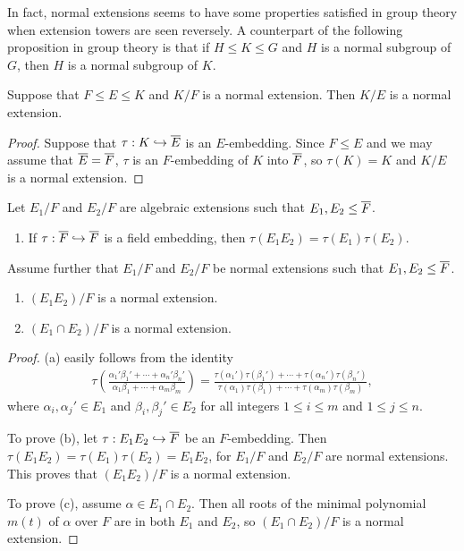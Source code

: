In fact, normal extensions seems to have some properties satisfied in group theory when extension towers are seen reversely.
A counterpart of the following proposition in group theory is that if $H\leq K\leq G$ and $H$ is a normal subgroup of $G$, then $H$ is a normal subgroup of $K$.
\begin{prop}
    Suppose that $F\leq E\leq K$ and $K/F$ is a normal extension.
    Then $K/E$ is a normal extension.
\end{prop}
\begin{proof}
    Suppose that $\tau: K\hookrightarrow\overline{E}$ is an $E$-embedding.
    Since $F\leq E$ and we may assume that $\overline{E}=\overline{F}$, $\tau$ is an $F$-embedding of $K$ into $\overline{F}$, so $\tau(K)=K$ and $K/E$ is a normal extension.
\end{proof}

\begin{prop}
    Let $E_1/F$ and $E_2/F$ are algebraic extensions such that $E_1, E_2\leq\overline{F}$.
    \begin{enumerate}
        \item[(a)]
        {
            If $\tau: \overline{F}\hookrightarrow \overline{F}$ is a field embedding, then $\tau(E_1E_2)=\tau(E_1)\tau(E_2)$.
        }
    \end{enumerate}
    Assume further that $E_1/F$ and $E_2/F$ be normal extensions such that $E_1, E_2\leq\overline{F}$.
    \begin{enumerate}
        \item[(b)]
        {
            $(E_1E_2)/F$ is a normal extension.
        }
        \item[(c)]
        {
            $(E_1\cap E_2)/F$ is a normal extension.
        }
    \end{enumerate}
\end{prop}
\begin{proof}
    (a) easily follows from the identity
    \begin{align*}
        \tau\left(\frac{\alpha_1'\beta_1'+\cdots+\alpha_n'\beta_n'}{\alpha_1\beta_1+\cdots+\alpha_m\beta_m}\right)
        =
        \frac{\tau(\alpha_1')\tau(\beta_1')+\cdots+\tau(\alpha_n')\tau(\beta_n')}{\tau(\alpha_1)\tau(\beta_1)+\cdots+\tau(\alpha_m)\tau(\beta_m)},
    \end{align*}
    where $\alpha_i, \alpha_j'\in E_1$ and $\beta_i, \beta_j'\in E_2$ for all integers $1\leq i\leq m$ and $1\leq j\leq n$.

    To prove (b), let $\tau: E_1E_2\hookrightarrow\overline{F}$ be an $F$-embedding.
    Then $\tau(E_1E_2)=\tau(E_1)\tau(E_2)=E_1E_2$, for $E_1/F$ and $E_2/F$ are normal extensions.
    This proves that $(E_1E_2)/F$ is a normal extension.

    To prove (c), assume $\alpha\in E_1\cap E_2$.
    Then all roots of the minimal polynomial $m(t)$ of $\alpha$ over $F$ are in both $E_1$ and $E_2$, so $(E_1\cap E_2)/F$ is a normal extension.
\end{proof}

